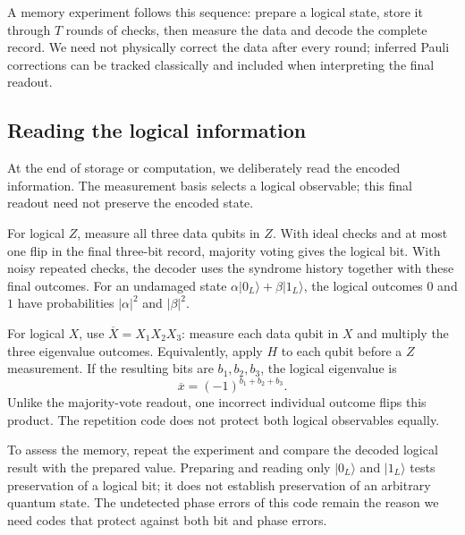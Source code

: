 \documentclass[11pt,a4paper]{article}
\newcommand{\ket}[1]{\lvert #1\rangle}
\begin{document}
A memory experiment follows this sequence: prepare a logical state,
store it through \(T\) rounds of checks, then measure the data and
decode the complete record. We need not physically correct the data
after every round; inferred Pauli corrections can be tracked
classically and included when interpreting the final readout.

\subsection{Reading the logical information}

At the end of storage or computation, we deliberately read the
encoded information. The measurement basis selects a logical
observable; this final readout need not preserve the encoded state.

For logical \(Z\), measure all three data qubits in \(Z\). With ideal
checks and at most one flip in the final three-bit record, majority
voting gives the logical bit. With noisy repeated checks, the decoder
uses the syndrome history together with these final outcomes.
For an undamaged state
\(\alpha\ket{0_L}+\beta\ket{1_L}\), the logical outcomes \(0\) and \(1\)
have probabilities \(|\alpha|^2\) and \(|\beta|^2\).

For logical \(X\), use \(\overline X=X_1X_2X_3\): measure each data
qubit in \(X\) and multiply the three eigenvalue outcomes.
Equivalently, apply \(H\) to each qubit before a \(Z\) measurement.
If the resulting bits are \(b_1,b_2,b_3\), the logical eigenvalue is
\begin{equation}
\overline x=(-1)^{b_1+b_2+b_3}.
\end{equation}
Unlike the majority-vote readout, one incorrect individual outcome
flips this product. The repetition code does not protect both
logical observables equally.

To assess the memory, repeat the experiment and compare the decoded
logical result with the prepared value. Preparing and reading only
\(\ket{0_L}\) and \(\ket{1_L}\) tests preservation of a logical bit;
it does not establish preservation of an arbitrary quantum state.
The undetected phase errors of this code remain the reason we need
codes that protect against both bit and phase errors.
\end{document}

